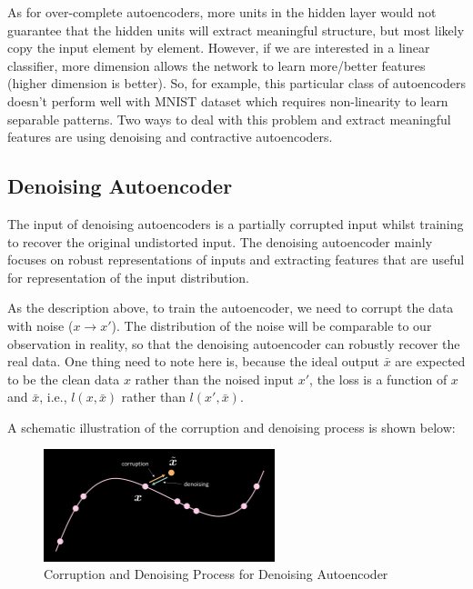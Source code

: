 As for over-complete autoencoders, more units in the hidden layer would not guarantee that the hidden units will extract meaningful structure, but most likely copy the input element by element. However, if we are interested in a linear classifier, more dimension allows the network to learn more/better features (higher dimension is better). So, for example, this particular class of autoencoders doesn't perform well with MNIST dataset which requires non-linearity to learn separable patterns. Two ways to deal with this problem and extract meaningful features are using denoising and contractive autoencoders.

\subsection{Denoising Autoencoder}

The input of denoising autoencoders is a partially corrupted input whilst training to recover the original undistorted input. The denoising autoencoder mainly focuses on robust representations of inputs and extracting features that are useful for representation of the input distribution.

As the description above, to train the autoencoder, we need to corrupt the data with noise ($x \rightarrow x'$). The distribution of the noise will be comparable to our observation in reality, so that the denoising autoencoder can robustly recover the real data.
One thing need to note here is, because the ideal output $\bar{x}$ are expected to be the clean data $x$ rather than the noised input $x'$, the loss is a function of $x$ and $\bar{x}$, i.e., $l(x,\bar{x})$ rather than $l(x',\bar{x})$.

A schematic illustration of the corruption and denoising process is shown below:

\begin{figure}[htb]
    \centering
    \includegraphics[width=0.6\textwidth]{figs/Corrpution_and_Denoising.png}
    \caption{Corruption and Denoising Process for Denoising Autoencoder}
    \label{fig:Corrpution_and_Denoising}
\end{figure}

